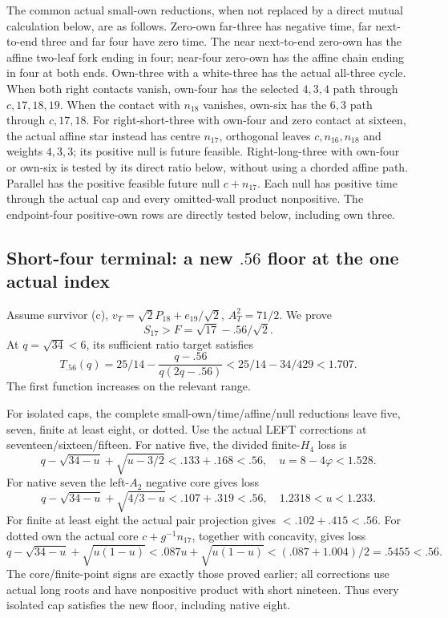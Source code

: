\documentclass[11pt]{article}
\theoremstyle{definition}
\theoremstyle{remark}
\begin{document}
The common actual small-own
reductions, when not replaced by
a direct mutual calculation below,
are as follows.
Zero-own far-three has negative
time, far next-to-end three and
far four have zero time.
The near next-to-end zero-own
has the affine two-leaf fork
ending in four; near-four
zero-own has the affine chain
ending in four at both ends.
Own-three with a white-three
has the actual all-three cycle.
When both right contacts vanish, own-four has the selected
\(4,3,4\) path through \(c,17,18,19\).
When the contact with \(n_{18}\) vanishes, own-six has the
\(6,3\) path through \(c,17,18\).
For right-short-three with own-four and zero contact at sixteen,
the actual affine star instead has centre \(n_{17}\), orthogonal
leaves \(c,n_{16},n_{18}\)
and weights \(4,3,3\); its positive null is future feasible.
Right-long-three with own-four or own-six is tested by its direct
ratio below, without using a chorded affine path.
Parallel has the positive feasible future null \(c+n_{17}\).
Each null has positive time
through the actual cap and every
omitted-wall product nonpositive.
The endpoint-four positive-own
rows are directly tested below,
including own three.

\subsection{Short-four terminal: a new \(.56\) floor at the one actual index}
\label{app:exact19:Bshortfourfloor}

Assume survivor (c),
\(v_T=\sqrt2P_{18}+e_{19}/\sqrt2\),
\(A_T^2=71/2\).
We prove
\[
                        S_{17}>F=\sqrt{17}-.56/\sqrt2 .
\tag{B19F56}\label{app:exact19:eq:BF56}
\]
At \(q=\sqrt{34}<6\), its sufficient
ratio target satisfies
\[
 T_{.56}(q)=25/14-\frac{q-.56}{q(2q-.56)}
                      <25/14-34/429<1.707 .
\]
The first function increases on
the relevant range.

For isolated caps, the complete
small-own/time/affine/null
reductions leave five, seven,
finite at least eight, or dotted.
Use the actual LEFT corrections
at seventeen/sixteen/fifteen.
For native five, the divided
finite-\(H_4\) loss is
\[
 q-\sqrt{34-u}+\sqrt{u-3/2}<.133+.168<.56,
                     \quad u=8-4\varphi<1.528 .
\]
For native seven the left-\(A_2\)
negative core gives loss
\[
 q-\sqrt{34-u}+\sqrt{4/3-u}<.107+.319<.56,
                         \quad1.2318<u<1.233 .
\]
For finite at least eight the
actual pair projection gives
\(<.102+.415<.56\).
For dotted own the actual core
\(c+g^{-1}n_{17}\), together with
concavity, gives loss
\[
 q-\sqrt{34-u}+\sqrt{u(1-u)}
  <.087u+\sqrt{u(1-u)}
  <(.087+1.004)/2=.5455<.56 .
\]
The core/finite-point signs are
exactly those proved earlier;
all corrections use actual long
roots and have nonpositive
product with short nineteen.
Thus every isolated cap satisfies
the new floor, including native
eight.
\end{document}
